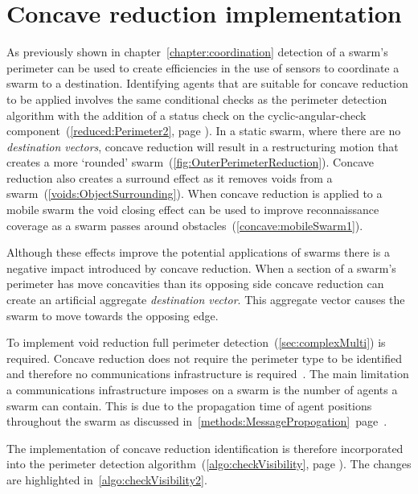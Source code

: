 \section{Concave reduction implementation}\label{sec:ConcaveReductionImp}
As previously shown in chapter~\ref{chapter:coordination} detection of a swarm's perimeter can be used to create efficiencies in the use of sensors to coordinate a swarm to a destination. Identifying agents that are suitable for concave reduction to be applied involves the same conditional checks as the perimeter detection algorithm with the addition of a status check on the cyclic-angular-check component~(\autoref{reduced:Perimeter2}, page \pageref{reduced:Perimeter2}). In a static swarm, where there are no \textit{destination vectors}, concave reduction will result in a restructuring motion that creates a more `rounded' swarm~(\autoref{fig:OuterPerimeterReduction}). Concave reduction also creates a surround effect as it removes voids from a swarm~(\autoref{voids:ObjectSurrounding}). When concave reduction is applied to a mobile swarm the void closing effect can be used to improve reconnaissance coverage as a swarm passes around obstacles~(\autoref{concave:mobileSwarm1}).

Although these effects improve the potential applications of swarms there is a negative impact introduced by concave reduction. When a section of a swarm's perimeter has move concavities than its opposing side concave reduction can create an artificial aggregate \textit{destination vector}. This aggregate vector causes the swarm to move towards the opposing edge. 

To implement void reduction full perimeter detection~(\autoref{sec:complexMulti}) is required. Concave reduction does not require the perimeter type to be identified and therefore no communications infrastructure is required~\cite{MD:09,NIM:09,SOM:12,ZFG:13,JG:13}. The main limitation a communications infrastructure imposes on a swarm is the number of agents a swarm can contain. This is due to the propagation time of agent positions throughout the swarm as discussed in~\autoref{methods:MessagePropogation}~page~\pageref{methods:MessagePropogation}. 

The implementation of concave reduction identification is therefore incorporated into the perimeter detection algorithm~(\autoref{algo:checkVisibility}, page \pageref{algo:checkVisibility}). The changes are highlighted in~\autoref{algo:checkVisibility2}.\\

